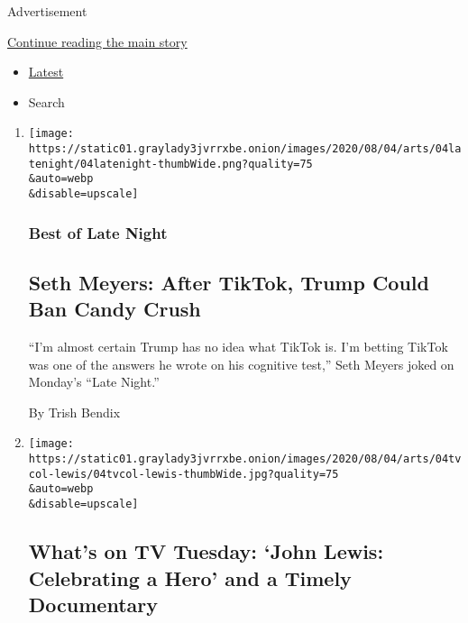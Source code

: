 Advertisement

\protect\hyperlink{after-mid1}{Continue reading the main story}

\begin{itemize}
\tightlist
\item
  \protect\hyperlink{stream-panel}{Latest}
\item
  Search
\end{itemize}

\begin{enumerate}
\def\labelenumi{\arabic{enumi}.}
\item
  \href{/2020/08/04/arts/television/seth-meyers-tiktok-trump.html}{}

  \texttt{[image: https://static01.graylady3jvrrxbe.onion/images/2020/08/04/arts/04latenight/04latenight-thumbWide.png?quality=75\\\&auto=webp\\\&disable=upscale]}

  \hypertarget{best-of-late-night}{%
  \subsubsection{Best of Late Night}\label{best-of-late-night}}

  \hypertarget{seth-meyers-after-tiktok-trump-could-ban-candy-crush}{%
  \subsection{Seth Meyers: After TikTok, Trump Could Ban Candy
  Crush}\label{seth-meyers-after-tiktok-trump-could-ban-candy-crush}}

  ``I'm almost certain Trump has no idea what TikTok is. I'm betting
  TikTok was one of the answers he wrote on his cognitive test,'' Seth
  Meyers joked on Monday's ``Late Night.''

  By Trish Bendix
\item
  \href{/2020/08/04/arts/television/whats-on-tv-tuesday.html}{}

  \texttt{[image: https://static01.graylady3jvrrxbe.onion/images/2020/08/04/arts/04tvcol-lewis/04tvcol-lewis-thumbWide.jpg?quality=75\\\&auto=webp\\\&disable=upscale]}

  \hypertarget{whats-on-tv-tuesday-john-lewis-celebrating-a-hero-and-a-timely-documentary}{%
  \subsection{What's on TV Tuesday: `John Lewis: Celebrating a Hero' and
  a Timely
  Documentary}\label{whats-on-tv-tuesday-john-lewis-celebrating-a-hero-and-a-timely-documentary}}


\end{enumerate}
